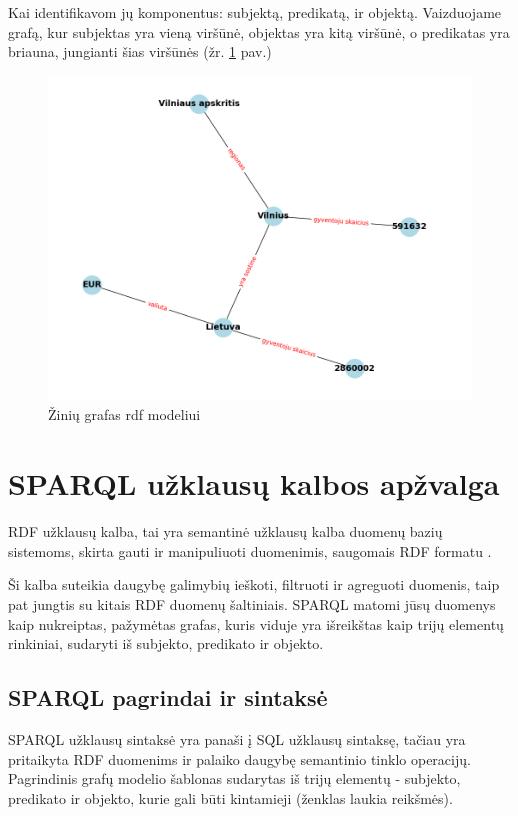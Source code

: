 \documentclass{VUMIFPSkursinis}
\begin{document}
Kai identifikavom jų komponentus: subjektą, predikatą, ir objektą. Vaizduojame grafą, kur subjektas yra vieną viršūnė, objektas yra kitą viršūnė, o predikatas yra briauna, jungianti šias viršūnės (žr. \ref{fig:rdf_example} pav.)
\begin{figure}[htbp]
  \centering
  \includegraphics[width=1\textwidth]{img/rdf_example.png}
  \caption{Žinių grafas rdf modeliui}
  \label{fig:rdf_example}
\end{figure}
\pagebreak

\section{SPARQL užklausų kalbos apžvalga}
RDF užklausų kalba, tai yra semantinė užklausų kalba duomenų bazių sistemoms, skirta gauti ir manipuliuoti duomenimis, saugomais RDF formatu \cite{wiki:sparql}.

Ši kalba suteikia daugybę galimybių ieškoti, filtruoti ir agreguoti duomenis, taip pat jungtis su kitais RDF duomenų šaltiniais. SPARQL matomi jūsų duomenys kaip nukreiptas, pažymėtas grafas, kuris viduje yra išreikštas kaip trijų elementų rinkiniai, sudaryti iš subjekto, predikato ir objekto.

\subsection{SPARQL pagrindai ir sintaksė}
SPARQL užklausų sintaksė yra panaši į SQL užklausų sintaksę, tačiau yra pritaikyta RDF duomenims ir palaiko daugybę semantinio tinklo operacijų. Pagrindinis grafų modelio šablonas sudarytas iš trijų elementų - subjekto, predikato ir objekto, kurie gali būti kintamieji (ženklas laukia reikšmės).
\end{document}
